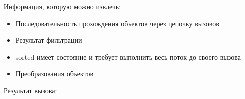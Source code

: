 \begin{frame}[noframenumbering]
\frametitle{\insertsection} 
\framesubtitle{\insertsubsection}
\fboxsep=0pt
\noindent
	\begin{minipage}[t]{0.48\linewidth}
		Информация, которую можно извлечь:
		\begin{itemize}
			\item Последовательность прохождения объектов через цепочку вызовов
			\item Результат фильтрации
			\item sorted имеет состояние и требует выполнить весь поток до своего вызова
			\item Преобразования объектов
		\end{itemize}
	\end{minipage}
	\hfill%
		\begin{minipage}[t]{0.48\linewidth}
			Результат вызова:
			\inputminted{text}{code/peekResults.txt}
		\end{minipage}
\end{frame}
